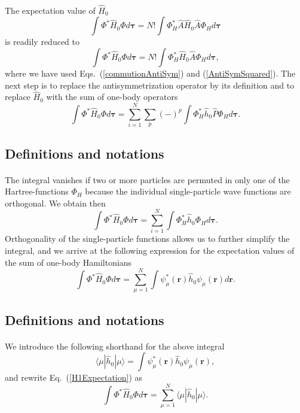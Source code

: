 \documentclass[%
twoside,                 %
final,                   %
10pt]{article}
\begin{document}
\paragraph{}
The expectation value of $\hat{H}_0$ 
\[
  \int \Phi^*\hat{H}_0\Phi d\mathbf{\tau} 
  = N! \int \Phi_H^*\hat{A}\hat{H}_0\hat{A}\Phi_H d\mathbf{\tau}
\]
is readily reduced to
\[
  \int \Phi^*\hat{H}_0\Phi d\mathbf{\tau} 
  = N! \int \Phi_H^*\hat{H}_0\hat{A}\Phi_H d\mathbf{\tau},
\]
where we have used Eqs.~(\ref{commutionAntiSym}) and
(\ref{AntiSymSquared}). The next step is to replace the antisymmetrization
operator by its definition and to
replace $\hat{H}_0$ with the sum of one-body operators
\[
  \int \Phi^*\hat{H}_0\Phi  d\mathbf{\tau}
  = \sum_{i=1}^N \sum_{p} (-)^p\int 
  \Phi_H^*\hat{h}_0\hat{P}\Phi_H d\mathbf{\tau}.
\]



\subsection{Definitions and notations}

\paragraph{}
The integral vanishes if two or more particles are permuted in only one
of the Hartree-functions $\Phi_H$ because the individual single-particle wave functions are
orthogonal. We obtain then
\[
  \int \Phi^*\hat{H}_0\Phi  d\mathbf{\tau}= \sum_{i=1}^N \int \Phi_H^*\hat{h}_0\Phi_H  d\mathbf{\tau}.
\]
Orthogonality of the single-particle functions allows us to further simplify the integral, and we
arrive at the following expression for the expectation values of the
sum of one-body Hamiltonians 
\begin{equation}
  \int \Phi^*\hat{H}_0\Phi  d\mathbf{\tau}
  = \sum_{\mu=1}^N \int \psi_{\mu}^*(\mathbf{r})\hat{h}_0\psi_{\mu}(\mathbf{r})
  d\mathbf{r}.
  \label{H1Expectation}
\end{equation}



\subsection{Definitions and notations}

\paragraph{}
We introduce the following shorthand for the above integral
\[
\langle \mu | \hat{h}_0 | \mu \rangle = \int \psi_{\mu}^*(\mathbf{r})\hat{h}_0\psi_{\mu}(\mathbf{r}),
\]
and rewrite Eq.~(\ref{H1Expectation}) as
\begin{equation}
  \int \Phi^*\hat{H}_0\Phi  d\mathbf{\tau}
  = \sum_{\mu=1}^N \langle \mu | \hat{h}_0 | \mu \rangle.
  \label{H1Expectation1}
\end{equation}
\end{document}
